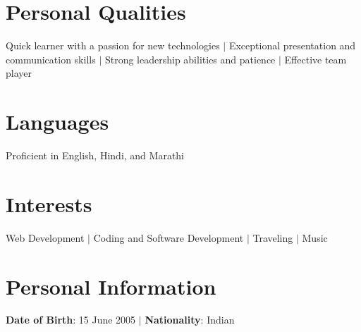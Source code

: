 \documentclass[a4paper,11pt]{article}
\begin{document}
\section{Personal Qualities}
\begin{itemize}[leftmargin=0.15in, label={}]
    \small{\item{
    Quick learner with a passion for new technologies $|$
    Exceptional presentation and communication skills $|$
    Strong leadership abilities and patience $|$
    Effective team player
    }}
\end{itemize}

\section{Languages}
\begin{itemize}[leftmargin=0.15in, label={}]
    \small{\item{
    Proficient in English, Hindi, and Marathi
    }}
\end{itemize}

\section{Interests}
\begin{itemize}[leftmargin=0.15in, label={}]
    \small{\item{
    Web Development $|$
    Coding and Software Development $|$
    Traveling $|$
    Music
    }}
\end{itemize}

\section{Personal Information}
\begin{itemize}[leftmargin=0.15in, label={}]
    \small{\item{
    \textbf{Date of Birth}: 15 June 2005 $|$
    \textbf{Nationality}: Indian
    }}
\end{itemize}
\end{document}
